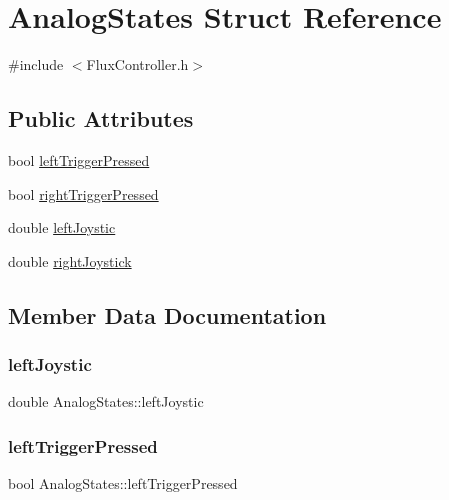 \hypertarget{structAnalogStates}{}\section{Analog\+States Struct Reference}
\label{structAnalogStates}


{\ttfamily \#include $<$Flux\+Controller.\+h$>$}

\subsection*{Public Attributes}
\begin{DoxyCompactItemize}
\item 
bool \hyperlink{structAnalogStates_a4652c5984341b0b929ceb72b3248bcfb}{left\+Trigger\+Pressed}
\item 
bool \hyperlink{structAnalogStates_aabedabe1fbaca0dc05b233afe51f1ac7}{right\+Trigger\+Pressed}
\item 
double \hyperlink{structAnalogStates_af2768e2c0f07d7a0edf57f31c9cf74d6}{left\+Joystic}
\item 
double \hyperlink{structAnalogStates_afa6408973c530772131737107f0c36f5}{right\+Joystick}
\end{DoxyCompactItemize}


\subsection{Member Data Documentation}
\mbox{\label{structAnalogStates_af2768e2c0f07d7a0edf57f31c9cf74d6}} 
\subsubsection{\texorpdfstring{left\+Joystic}{leftJoystic}}
{\footnotesize\ttfamily double Analog\+States\+::left\+Joystic}

\mbox{\label{structAnalogStates_a4652c5984341b0b929ceb72b3248bcfb}} 
\subsubsection{\texorpdfstring{left\+Trigger\+Pressed}{leftTriggerPressed}}
{\footnotesize\ttfamily bool Analog\+States\+::left\+Trigger\+Pressed}


